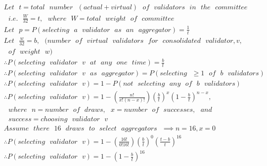 \documentclass{article}
\begin{document}
\noindent
\begin{equation*}
\begin{split}
& Let \texttt{ } t = total  \texttt{ } number \texttt{ } (actual  + virtual)  \texttt{ } of \texttt{ } validators \texttt{ } in  \texttt{ }  the  \texttt{ } committee\\
& 
\texttt{                  } i.e. \texttt{ } \frac{W}{32} = t, \texttt{ } where \texttt{ } W = total \texttt{ } weight \texttt{ } of \texttt{ }committee\\
& 
Let  \texttt{ } p = P(selecting \texttt{ } a \texttt{ } validator \texttt{ } as \texttt{ } an \texttt{ } aggregator) = \frac{1}{t}\\
& 
Let \texttt{ }  \frac{w}{32} = b,   \texttt{ } (number \texttt{ } of \texttt{ } virtual \texttt{ }  validators \texttt{ }  for  \texttt{ } consolidated \texttt{ } validator,  v,\\
& 
\texttt{                  }  of  \texttt{ } weight \texttt{ }  w) \\
& 
\therefore P(selecting \texttt{ } validator \texttt{ } v \texttt{ } at \texttt{ } any \texttt{ } one \texttt{ } time) = \frac{b}{t}\\
& 
\therefore P(selecting \texttt{ }  validator \texttt{ } v \texttt{ } as \texttt{ }aggregator) =  P(selecting \texttt{ } \geqslant 1 \texttt{ } of \texttt{ } b \texttt{ } validators) \\
& 
\therefore P(selecting \texttt{ }  validator \texttt{ } v) = 1 - P(not \texttt{ } selecting \texttt{ } any \texttt{ } of \texttt{ } b  \texttt{ }validators) \\
& 
\therefore P(selecting \texttt{ }  validator \texttt{ } v) = 1 - \left(\frac{n!}{x!(n-x)!} \right) \left( \frac{b}{t} \right)^x \left( 1 - \frac{b}{t} \right)^{n-x}, \\
& 
\texttt{                  } where \texttt{ } n = number \texttt{ } of \texttt{ } draws, \texttt{ } x = number \texttt{ } of \texttt{ } successes, \texttt{ } and \\
&
 \texttt{                  }  success = choosing \texttt{ } validator \texttt{ } v\\
& 
Assume \texttt{ } there \texttt{ } 16 \texttt{ } draws \texttt{ } to \texttt{ } select \texttt{ } aggregators \texttt{ } \implies n = 16, x = 0\\
& 
\therefore P(selecting \texttt{ }  validator \texttt{ } v) = 1 - \left(\frac{16!}{0!16!} \right) \left( \frac{b}{t} \right)^0 \left(\frac{t - b}{t} \right)^{16} \\
& 
\therefore P(selecting \texttt{ }  validator \texttt{ } v) = 1 - \left( 1 - \frac{b}{t} \right)^{16} 
\end{split}
\end{equation*}
\end{document}
